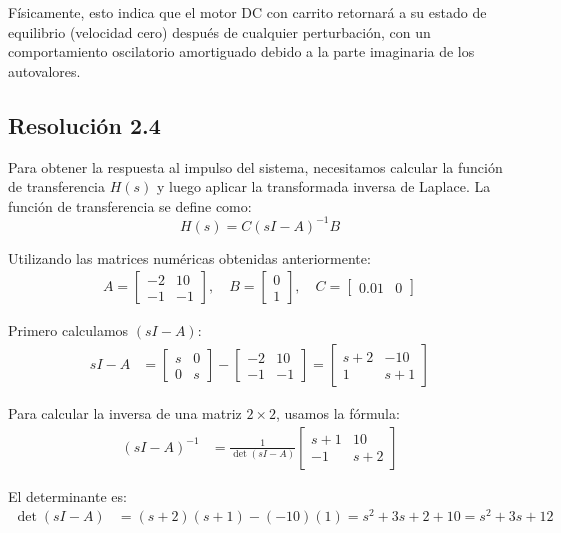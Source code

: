 \documentclass[
  11pt,
  letterpaper,
   addpoints,
   answers
  ]{exam}
\begin{document}
\begin{solution}
Físicamente, esto indica que el motor DC con carrito retornará a su estado de equilibrio (velocidad cero) después de cualquier perturbación, con un comportamiento oscilatorio amortiguado debido a la parte imaginaria de los autovalores.
\subsection*{Resolución 2.4}

Para obtener la respuesta al impulso del sistema, necesitamos calcular la función de transferencia $H(s)$ y luego aplicar la transformada inversa de Laplace. La función de transferencia se define como:
\begin{equation}
H(s) = C(sI-A)^{-1}B
\end{equation}

Utilizando las matrices numéricas obtenidas anteriormente:
\begin{align}
A=\begin{bmatrix}-2&10\\-1&-1\end{bmatrix}, \quad
B=\begin{bmatrix}0\\1\end{bmatrix}, \quad
C=\begin{bmatrix}0.01&0\end{bmatrix}
\end{align}

Primero calculamos $(sI-A)$:
\begin{align}
sI-A &= \begin{bmatrix}s&0\\0&s\end{bmatrix} - \begin{bmatrix}-2&10\\-1&-1\end{bmatrix} = \begin{bmatrix}s+2&-10\\ 1&s+1\end{bmatrix}
\end{align}

Para calcular la inversa de una matriz $2 \times 2$, usamos la fórmula:
\begin{align}
(sI-A)^{-1} &= \frac{1}{\det(sI-A)} \begin{bmatrix}s+1&10\\ -1&s+2\end{bmatrix}
\end{align}

El determinante es:
\begin{align}
\det(sI-A) &= (s+2)(s+1) - (-10)(1) = s^2+3s+2+10 = s^2+3s+12
\end{align}


\end{solution}
\end{document}
